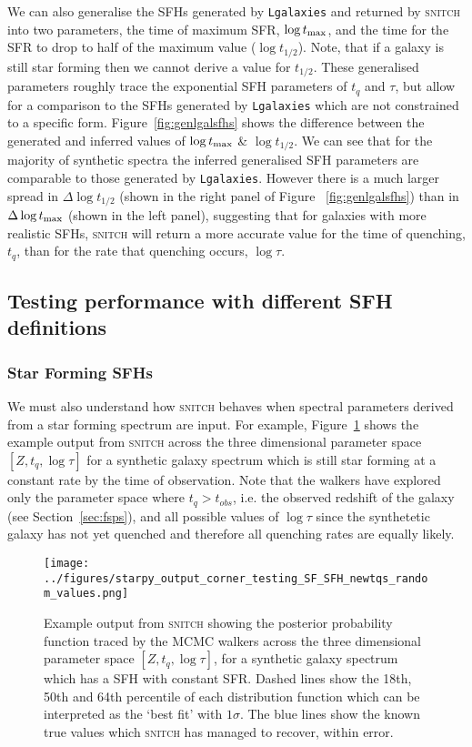 \documentclass[useAMS,usenatbib]{mn2e}
\begin{document}
We can also generalise the SFHs generated by \texttt{Lgalaxies} and returned by \textsc{snitch} into two parameters, the time of maximum SFR, $\log t_{\rm{max}}$, and the time for the SFR to drop to half of the maximum value ($\log t_{1/2}$). Note, that if a galaxy is still star forming then we cannot derive a value for $t_{1/2}$. These generalised parameters roughly trace the exponential SFH parameters of $t_q$ and $\tau$, but allow for a comparison to the SFHs generated by \texttt{Lgalaxies} which are not constrained to a specific form. Figure~\ref{fig:genlgalsfhs} shows the difference between the generated and inferred values of $\log t_{\rm{max}}$ \& $\log t_{1/2}$. We can see that for the majority of synthetic spectra the inferred generalised SFH parameters are comparable to those generated by \texttt{Lgalaxies}. However there is a much larger spread in $\Delta \log t_{1/2}$ (shown in the right panel of Figure ~\ref{fig:genlgalsfhs}) than in $\Delta \log t_{\rm{max}}$ (shown in the left panel), suggesting that for galaxies with more realistic SFHs, \textsc{snitch} will return a more accurate value for the time of quenching, $t_q$, than for the rate that quenching occurs, $\log \tau$.



\subsection{Testing performance with different SFH definitions}\label{sec:diffSFHs}

\subsubsection{Star Forming SFHs}\label{secsec:starforming}

We must also understand how \textsc{snitch} behaves when spectral parameters derived from a star forming spectrum are input. For example, Figure~\ref{fig:sfgal} shows the example output from \textsc{snitch} across the three dimensional parameter space $[Z,t_q,\log \tau]$ for a synthetic galaxy spectrum which is still star forming at a constant rate by the time of observation. Note that the walkers have explored only the parameter space where $t_q > t_{obs}$, i.e. the observed redshift of the galaxy (see Section~\ref{sec:fsps}), and all possible values of $\log \tau$ since the synthetetic galaxy has not yet quenched and therefore all quenching rates are equally likely.  

\begin{figure}
\centering
\texttt{[image: ../figures/starpy\_output\_corner\_testing\_SF\_SFH\_newtqs\_random\_values.png]}
\caption{Example output from \textsc{snitch} showing the posterior probability function traced by the MCMC walkers across the three dimensional parameter space $[Z,t_q,\log \tau]$, for a synthetic galaxy spectrum which has a SFH with constant SFR.  Dashed lines show the 18th, 50th and 64th percentile of each distribution function which can be interpreted as the `best fit' with $1\sigma$. The blue lines show the known true values which \textsc{snitch} has managed to recover, within error. }
\label{fig:sfgal}
\end{figure}
\end{document}

